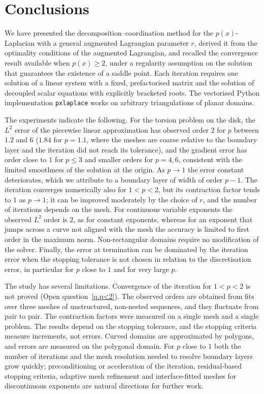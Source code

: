 \documentclass[11pt]{amsart}
\theoremstyle{definition}
\theoremstyle{remark}
\numberwithin{equation}{section}
\begin{document}
\section{Conclusions}\label{sec.conclusions}

We have presented the decomposition--coordination method for the $p(x)$-Laplacian with a general augmented Lagrangian parameter $r$, derived it from the optimality conditions of the augmented Lagrangian, and recalled the convergence result available when $p(x)\ge2$, under a regularity assumption on the solution that guarantees the existence of a saddle point. Each iteration requires one solution of a linear system with a fixed, prefactorised matrix and the solution of decoupled scalar equations with explicitly bracketed roots. The vectorised Python implementation \texttt{pxlaplace} works on arbitrary triangulations of planar domains.

The experiments indicate the following. For the torsion problem on the disk, the $L^2$ error of the piecewise linear approximation has observed order $2$ for $p$ between $1.2$ and $6$ ($1.84$ for $p=1.1$, where the meshes are coarse relative to the boundary layer and the iteration did not reach its tolerance), and the gradient error has order close to $1$ for $p\le3$ and smaller orders for $p=4,6$, consistent with the limited smoothness of the solution at the origin. As $p\to1$ the error constant deteriorates, which we attribute to a boundary layer of width of order $p-1$. The iteration converges numerically also for $1<p<2$, but its contraction factor tends to $1$ as $p\to1$; it can be improved moderately by the choice of $r$, and the number of iterations depends on the mesh. For continuous variable exponents the observed $L^2$ order is $2$, as for constant exponents, whereas for an exponent that jumps across a curve not aligned with the mesh the accuracy is limited to first order in the maximum norm. Non-rectangular domains require no modification of the solver. Finally, the error at termination can be dominated by the iteration error when the stopping tolerance is not chosen in relation to the discretisation error, in particular for $p$ close to $1$ and for very large $p$.

The study has several limitations. Convergence of the iteration for $1<p<2$ is not proved (Open question~\ref{q.p<2}). The observed orders are obtained from fits over three meshes of unstructured, non-nested sequences, and they fluctuate from pair to pair. The contraction factors were measured on a single mesh and a single problem. The results depend on the stopping tolerance, and the stopping criteria measure increments, not errors. Curved domains are approximated by polygons, and errors are measured on the polygonal domain. For $p$ close to $1$ both the number of iterations and the mesh resolution needed to resolve boundary layers grow quickly; preconditioning or acceleration of the iteration, residual-based stopping criteria, adaptive mesh refinement and interface-fitted meshes for discontinuous exponents are natural directions for further work.
\end{document}
